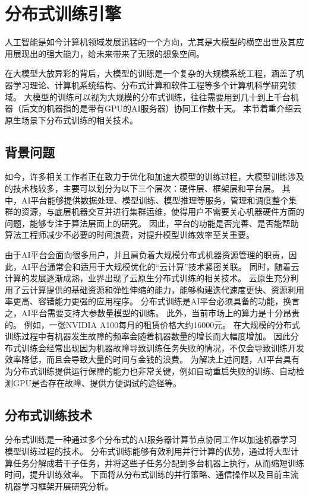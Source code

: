 \section{分布式训练引擎}

人工智能是如今计算机领域发展迅猛的一个方向，尤其是大模型的横空出世及其应用展现出的强大能力，给未来带来了无限的想象空间。

在大模型大放异彩的背后，大模型的训练是一个复杂的大规模系统工程，涵盖了机器学习理论、计算机系统结构、分布式计算和软件工程等多个计算机科学研究领域。
大模型的训练可以视为大规模的分布式训练，往往需要用到几十到上千台机器（后文的机器指的是带有GPU的AI服务器）协同工作数十天。
本节着重介绍云原生场景下分布式训练的相关技术。

\subsection{背景问题}
如今，许多相关工作者正在致力于优化和加速大模型的训练过程，大模型训练涉及的技术栈较多，主要可以划分为以下三个层次：硬件层、框架层和平台层。
其中，AI平台能够提供数据处理、模型训练、模型推理等服务，管理和调度整个集群的资源，与底层机器交互并进行集群运维，使得用户不需要关心机器硬件方面的问题，能够专注于算法层面上的研究。
因此，平台的功能是否完善、是否能帮助算法工程师减少不必要的时间浪费，对提升模型训练效率至关重要。

由于AI平台会面向很多用户，并且肩负着大规模分布式机器资源管理的职责，因此，AI平台通常会和适用于大规模优化的“云计算”技术紧密关联。
同时，随着云计算的发展逐渐成熟，业界出现了云原生分布式训练的相关技术。
云原生充分利用了云计算提供的基础资源和弹性伸缩的能力，能够构建迭代速度更快、资源利用率更高、容错能力更强的应用程序。
分布式训练是AI平台必须具备的功能，换言之，AI平台需要支持大参数量模型的训练。
此外，当前市场上的算力是十分昂贵的。
例如，一张NVIDIA A100每月的租赁价格大约16000元。
在大规模的分布式训练过程中有机器发生故障的频率会随着机器数量的增长而大幅度增加。
因此分布式训练会经常出现因为机器故障导致训练任务失败的情况，不仅会导致训练开发效率降低，而且会导致大量的时间与金钱的浪费。
为解决上述问题，AI平台具有为分布式训练提供运行保障的能力也非常关键，例如自动重启失败的训练、自动检测GPU是否存在故障、提供方便调试的途径等。

\subsection{分布式训练技术}
分布式训练是一种通过多个分布式的AI服务器计算节点协同工作以加速机器学习模型训练过程的技术。
分布式训练能够有效利用并行计算的优势，通过将大型计算任务分解成若干子任务，并将这些子任务分配到多台机器上执行，从而缩短训练时间，提升训练效率。
下面将从分布式训练的并行策略、通信操作以及目前主流机器学习框架开展研究分析。

